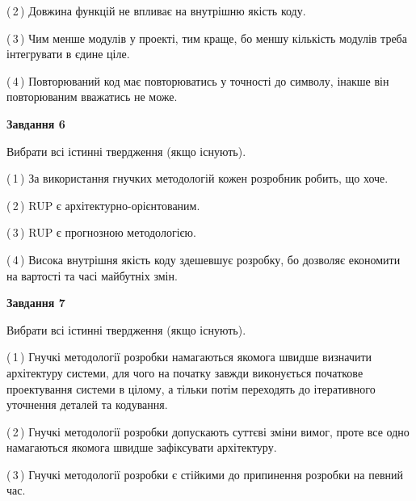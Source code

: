 \documentclass[10pt, ukrainian]{article}
\begin{document}
{\begin {large}
(\,2\,) Довжина функцій не впливає на внутрішню якість коду. %



(\,3\,) Чим менше модулів у проекті, тим краще, бо меншу кількість модулів треба інтегрувати в єдине ціле. %



(\,4\,) Повторюваний код має повторюватись у точності до символу, інакше він повторюваним вважатись не може. %

\newpage

{\begin {center}\textbf{Завдання 6}\end {center}}\par
Вибрати всі істинні твердження (якщо існують).\par
\vspace{2mm}



(\,1\,) За використання гнучких методологій кожен розробник робить, що хоче. %



(\,2\,) RUP є архітектурно-орієнтованим. %



(\,3\,) RUP є прогнозною методологією. %



(\,4\,) Висока внутрішня якість коду здешевшує розробку, бо дозволяє економити на вартості та часі майбутніх змін. %


{\begin {center}\textbf{Завдання 7}\end {center}}\par
Вибрати всі істинні твердження (якщо існують).\par
\vspace{2mm}



(\,1\,) Гнучкі методології розробки намагаються якомога швидше визначити архітектуру системи, для чого на початку завжди виконується початкове проектування системи в цілому, а тільки потім переходять до ітеративного уточнення деталей та кодування. %



(\,2\,) Гнучкі методології розробки допускають суттєві зміни вимог, проте все одно намагаються якомога швидше зафіксувати архітектуру. %



(\,3\,) Гнучкі методології розробки є стійкими до припинення розробки на певний час. %




\end{large}}
\end{document}
